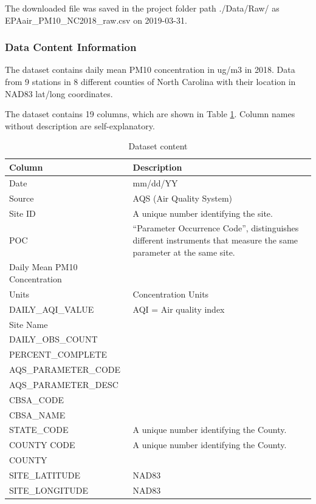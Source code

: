 \documentclass[12pt,]{article}
\begin{document}
The downloaded file was saved in the project folder path ./Data/Raw/ as
EPAair\_PM10\_NC2018\_raw.csv on 2019-03-31.

\subsubsection{Data Content
Information}\label{data-content-information-1}

The dataset contains daily mean PM10 concentration in ug/m3 in 2018.
Data from 9 stations in 8 different counties of North Carolina with
their location in NAD83 lat/long coordinates.

The dataset contains 19 columns, which are shown in Table
\ref{tab:tab5}. Column names without description are self-explanatory.

\begin{table}[ht]
\centering
\begin{tabular}{p{2.5in}p{3.5in}}
  \hline
Column & Description \\ 
  \hline
Date & mm/dd/YY \\ 
  Source & AQS (Air Quality System) \\ 
  Site ID & A unique number identifying the site. \\ 
  POC & “Parameter Occurrence Code”, distinguishes different instruments that measure the same parameter at the same site. \\ 
  Daily Mean PM10 Concentration &  \\ 
  Units & Concentration Units \\ 
  DAILY\_AQI\_VALUE & AQI = Air quality index \\ 
  Site Name &  \\ 
  DAILY\_OBS\_COUNT &  \\ 
  PERCENT\_COMPLETE &  \\ 
  AQS\_PARAMETER\_CODE &  \\ 
  AQS\_PARAMETER\_DESC &  \\ 
  CBSA\_CODE &  \\ 
  CBSA\_NAME &  \\ 
  STATE\_CODE & A unique number identifying the County. \\ 
  COUNTY CODE & A unique number identifying the County. \\ 
  COUNTY &  \\ 
  SITE\_LATITUDE & NAD83 \\ 
  SITE\_LONGITUDE & NAD83 \\ 
   \hline
\end{tabular}
\caption{Dataset content} 
\label{tab:tab5}
\end{table}
\end{document}
